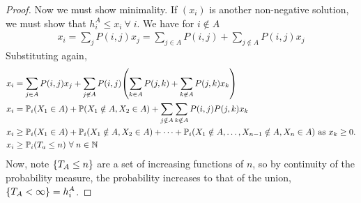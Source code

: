 \begin{proof}
	Now we must show minimality.
	If $(x_i)$ is another non-negative solution, we must show that $h_i^A \leq x_i \ \forall \; i$.
	We have for $i \notin A$
	\begin{align*}
		x_i = \sum_j P(i,j) x_j = \sum_{j \in A} P(i,j) + \sum_{j \not\in A} P(i,j) x_j
	\end{align*}
	Substituting again,
	\begin{align*}
		x_i &= \sum_{j \in A} P(i,j) x_j + \sum_{j \not\in A} P(i,j) \qty( \sum_{k \in A} P(j,k) + \sum_{k \not\in A} P(j,k) x_k ) \\
		x_i &= \mathbb{P}_i(X_1 \in A) + \mathbb{P}(X_1 \notin A, X_2 \in A) + \sum_{j \notin A} \sum_{k \notin A} P(i, j) P(j, k) x_k \\
		x_i &\geq \mathbb{P}_i(X_1 \in A) + \mathbb{P}_i(X_1 \notin A, X_2 \in A) + \dots + \mathbb{P}_i(X_1 \notin A, \dots, X_{n-1} \notin A, X_n \in A) \text{ as } x_k \geq 0. \\
		x_i &\geq \mathbb{P}_i(T_a \leq n) \ \forall \; n \in \mathbb{N}
	\end{align*}
	Now, note $\qty{T_A \leq n}$ are a set of increasing functions of $n$, so by continuity of the probability measure, the probability increases to that of the union, $\qty{T_A < \infty} = h_i^A$.
\end{proof}
